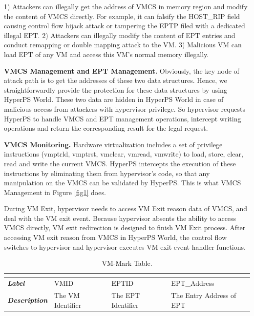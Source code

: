 \documentclass[conference]{IEEEtran}
\begin{document}
1) Attackers can illegally get the address of VMCS in memory region and modify the content of VMCS directly. For example, it can falsify the HOST\_RIP field causing control flow hijack attack or tampering the EPTP filed with a dedicated illegal EPT.
2) Attackers can illegally modify the content of EPT entries
and conduct remapping or double mapping attack to the VM.
3) Malicious VM can load EPT of any VM and access this VM's normal memory illegally.

\iffalse
\textbf{VMCS Management and EPT Management.}
Obviously, the key node of attack path is to get the addresses of these two data structures.
Hence, we straightforwardly provide the protection for these data structures by using HyperPS World. These two data are hidden in HyperPS World in case of malicious access from attackers with hypervisor privilege. 
So hypervisor requests HyperPS to handle VMCS and EPT management operations, intercept writing operations and return the corresponding result for the legal request. 

\textbf{VMCS Monitoring.}
Hardware virtualization includes a set of privilege instructions (vmptrld, vmptrst, vmclear, vmread, vmwrite) to load, store, clear, read and write the current VMCS. HyperPS intercepts the execution of these instructions by eliminating them from hypervisor's code, so that any manipulation on the VMCS can be validated by HyperPS. This is what VMCS Management in Figure \ref{fig1} does.

During VM Exit, hypervisor needs to access VM Exit reason data of VMCS, and deal with the VM exit event.
Because hypervisor absents the ability to access VMCS directly, VM exit redirection is designed to finish VM Exit process. After accessing VM exit reason from VMCS in HyperPS World, the control flow switches to hypervisor and hypervisor executes VM exit event handler functions.


\begin{table}[htbp]
\centering
\caption{VM-Mark Table.}\label{tab1}
\begin{tabular}{p{1.4cm}|p{1.2cm}|p{1.1cm}|p{1.7cm}}
\hline
\multicolumn{4}{c}{\bfseries\textbf\centering{VM-Mark Table}}\\
\hline
{\itshape\bfseries Label} & VMID & EPTID & EPT\_Address\\
\hline
{\itshape\bfseries Description} & { The VM Identifier} & The EPT Identifier & The Entry Address of EPT\\
\hline
\end{tabular}
\end{table}
\end{document}
